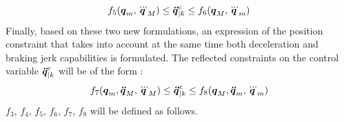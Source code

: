 \documentclass[a4paper, 10pt, conference]{ieeeconf}      %
\newcommand{\vect}[1]{\mbox{\boldmath${#1}$}}%
\begin{document}
{{\begin{equation}
\begin{split}
f_5(\vect{q}_m, \vect{\dddot{q}}_M) \leq \vect{\ddot{q}}_{|k}^{c} \leq f_6(\vect{q}_M, \vect{\dddot{q}}_m) 
\label{eq:qddot_cond_to_satisfy_Jerk_posi_compatibility}
\end{split}
\end{equation}
Finally, based on these two new formulations, an expression of the position constraint that takes into account at the same time both deceleration and braking jerk capabilities is formulated. The reflected constraints on the control variable $\vect{\ddot{q}}_{|k}^{c}$ will be of the form : 
\begin{equation}
\begin{split}
f_7(\vect{q}_m, \vect{\ddot{q}}_M, \vect{\dddot{q}}_M) \leq \vect{\ddot{q}}_{|k}^{c} \leq f_8(\vect{q}_M, \vect{\ddot{q}}_m, \vect{\dddot{q}}_m) 
\label{eq:qddot_cond_to_satisfy_Acc_Jerk_posi_compatibility}
\end{split}
\end{equation}
$f_3$, $f_4$, $f_5$, $f_6$, $f_7$, $f_8$ will be defined as follows. 
\\
}}
\end{document}
